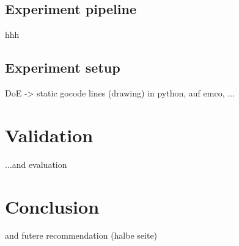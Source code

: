 \documentclass[5p,times,procedia]{elsarticle}
\newenvironment{note}{%
	\noindent
    \color{notecolor}%
}{%
    \par\medskip%
}
\begin{document}
\subsection{Experiment pipeline}
\vspace*{-\baselineskip}
hhh

\subsection{Experiment setup}
\vspace*{-\baselineskip}
DoE -> static gocode lines (drawing) 
in python, auf emco, ...


 
\section{Validation}
\begin{note}
	...and evaluation

\end{note}
\section{Conclusion}
\begin{note}
	and futere recommendation (halbe seite)
	
\end{note}





\end{document}
